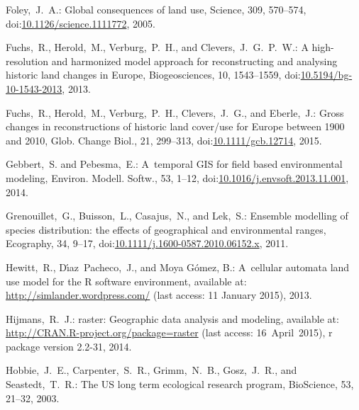\documentclass[gmdd, online, hvmath]{copernicus}
\begin{document}
\begin{thebibliography}{97}
 Foley,~J.~A.: Global consequences
  of land use, Science, 309, 570--574,
doi:\href{http://dx.doi.org/10.1126/science.1111772}{10.1126/science.1111772},
  2005. %


 Fuchs,~R., Herold,~M., Verburg,~P.~H., and
  Clevers,~J.~G.~P.~W.: A high-resolution and harmonized model
  approach for reconstructing and analysing historic land changes in
  Europe, Biogeosciences, 10, 1543--1559,
  doi:\href{http://dx.doi.org/10.5194/bg-10-1543-2013}{10.5194/bg-10-1543-2013}, 2013. %



 Fuchs,~R., Herold,~M., Verburg,~P.~H.,
  Clevers,~J.~G., and Eberle,~J.: Gross changes in reconstructions of
  historic land cover/use for Europe between 1900 and 2010,
  Glob. Change Biol., 21, 299--313,
doi:\href{http://dx.doi.org/10.1111/gcb.12714}{10.1111/gcb.12714}, 2015.


 Gebbert,~S. and
  Pebesma,~E.: A~temporal {GIS} for field based environmental
  modeling, Environ. Modell. Softw., 53, 1--12,
  doi:\href{http://dx.doi.org/10.1016/j.envsoft.2013.11.001}{10.1016/j.envsoft.2013.11.001}, 2014. %


 Grenouillet,~G., Buisson,~L., Casajus,~N.,
  and Lek,~S.: Ensemble modelling of species distribution: the effects
  of geographical and environmental ranges, Ecography, 34, 9--17,
  doi:\href{http://dx.doi.org/10.1111/j.1600-0587.2010.06152.x}{10.1111/j.1600-0587.2010.06152.x}, 2011.


 Hewitt,~R., D\'{\i}az~Pacheco,~J., and
Moya G\'omez, B.: A~cellular automata
  land use model for the R software environment, available at:
  \url{http://simlander.wordpress.com/} (last access: 11 January
  2015), 2013.


 Hijmans,~R.~J.: raster:
  Geographic data analysis and modeling, available at:
  \url{http://CRAN.R-project.org/package=raster} (last
  access: 16~April~2015), r package
  version 2.2-31, 2014.


 Hobbie,~J.~E., Carpenter,~S.~R.,
  Grimm,~N.~B., Gosz,~J.~R., and Seastedt,~T.~R.: The {US} long term
  ecological research program, {BioScience}, 53, 21--32, 2003.



\end{thebibliography}
\end{document}
